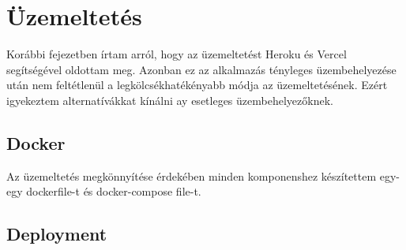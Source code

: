 \chapter{Üzemeltetés}
Korábbi fejezetben írtam arról, hogy az üzemeltetést Heroku és Vercel segítségével oldottam meg.
Azonban ez az alkalmazás tényleges üzembehelyezése után nem feltétlenül a legkölcsékhatékényabb módja az üzemeltetésének.
Ezért igyekeztem alternatívákkat kínálni ay esetleges üzembehelyezőknek.

\section{Docker}
Az üzemeltetés megkönnyítése érdekében minden komponenshez készítettem egy-egy dockerfile-t és docker-compose file-t.

\section{Deployment}

